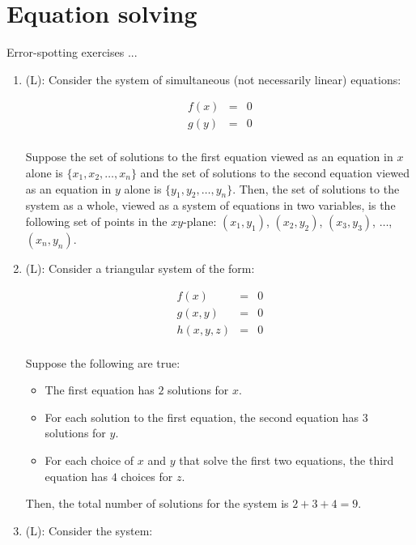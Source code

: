 \documentclass[10pt]{amsart}
\begin{document}
\section{Equation solving}

Error-spotting exercises ...

\begin{enumerate}
\item (L): Consider the system of simultaneous (not necessarily
  linear) equations:

  \begin{eqnarray*}
    f(x) & = & 0\\
    g(y) & = & 0\\
  \end{eqnarray*}

  Suppose the set of solutions to the first equation viewed as an
  equation in $x$ alone is $\{ x_1,x_2,\dots,x_n\}$ and the set of
  solutions to the second equation viewed as an equation in $y$ alone
  is $\{ y_1, y_2, \dots, y_n \}$. Then, the set of solutions to the
  system as a whole, viewed as a system of equations in two variables,
  is the following set of points in the $xy$-plane: $(x_1,y_1)$,
  $(x_2,y_2)$, $(x_3,y_3)$, $\dots$, $(x_n,y_n)$.

\item (L): Consider a triangular system of the form:

  \begin{eqnarray*}
    f(x) & = & 0\\
    g(x,y) & = & 0 \\
    h(x,y,z)&=& 0\\
  \end{eqnarray*}

  Suppose the following are true:

  \begin{itemize}
  \item The first equation has $2$ solutions for $x$. 
  \item For each solution to the first equation, the second equation
    has $3$ solutions for $y$.
  \item For each choice of $x$ and $y$ that solve the first two
    equations, the third equation has $4$ choices for $z$.
  \end{itemize}

  Then, the total number of solutions for the system is $2 + 3 + 4 =
  9$.

\item (L): Consider the system:


\end{enumerate}
\end{document}

